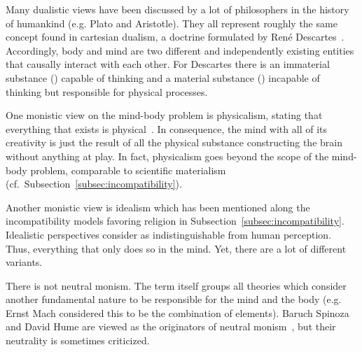 Many dualistic views have been discussed by a lot of philosophers in the history of humankind (e.g. Plato and Aristotle).
They all represent roughly the same concept found in cartesian dualism, a doctrine formulated by René Descartes~\cite{Leach2017}.
Accordingly, body and mind are two different and independently existing entities that causally interact with each other.
For Descartes there is an immaterial substance () capable of thinking and a material substance () incapable of thinking but responsible for physical processes.


One monistic view on the mind-body problem is physicalism, stating that everything that exists is physical~\cite{stoljar2010physicalism}. In consequence, the mind with all of its creativity is just the result of all the physical substance constructing the brain without anything  at play.
In fact, physicalism goes beyond the scope of the mind-body problem, comparable to scientific materialism~\cite{Crane1990} (cf.~Subsection~\ref{subsec:incompatibility}).

Another monistic view is idealism which has been mentioned along the incompatibility models favoring religion in Subsection~\ref{subsec:incompatibility}.
Idealistic perspectives consider  as indistinguishable from human perception.
Thus, everything that  only does so in the mind.
Yet, there are a lot of different variants.

There is not  neutral monism. The term itself groups all theories which consider another fundamental nature to be responsible for the mind and the body (e.g. Ernst Mach considered this to be the combination of elements).
Baruch Spinoza and David Hume are viewed as the originators of neutral monism~\cite{rosenkrantz2010historical}, but their neutrality is sometimes criticized.


